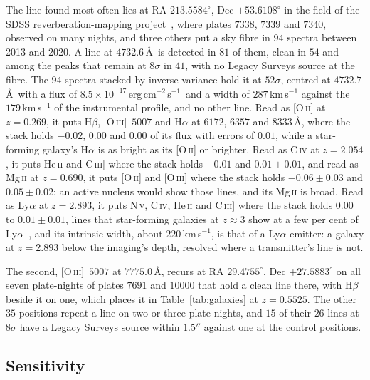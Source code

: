 \documentclass[3p,11pt]{elsarticle}
\newcommand{\flux}{erg\,cm$^{-2}$\,s$^{-1}$}
\begin{document}
The line found most often lies at RA $213.5584^\circ$, Dec $+53.6108^\circ$ in the field
of the SDSS reverberation-mapping project~\cite{Shen2015}, where plates $7338$, $7339$ and
$7340$, observed on many nights, and three others put a sky fibre in $94$ spectra between
2013 and 2020. A line at $4732.6$\,\AA\ is detected in $81$ of them, clean in $54$ and
among the peaks that remain at $8\sigma$ in $41$, with no Legacy Surveys source at the
fibre. The $94$ spectra stacked by inverse variance hold it at
$52\sigma$, centred at $4732.7$\,\AA\ with a flux of $8.5\times10^{-17}$\,\flux\ and a
width of $287$\,km\,s$^{-1}$ against the $179$\,km\,s$^{-1}$ of the instrumental profile,
and no other line. Read as [O\,\textsc{ii}] at $z=0.269$, it puts H$\beta$,
[O\,\textsc{iii}]~$5007$ and H$\alpha$ at $6172$, $6357$ and $8333$\,\AA, where the stack
holds $-0.02$, $0.00$ and $0.00$ of its flux with errors of $0.01$, while a star-forming
galaxy's H$\alpha$ is as bright as its [O\,\textsc{ii}] or brighter. Read as
C\,\textsc{iv} at $z=2.054$, it puts He\,\textsc{ii} and C\,\textsc{iii}] where the stack
holds $-0.01$ and $0.01\pm0.01$, and read as Mg\,\textsc{ii} at $z=0.690$, it puts
[O\,\textsc{ii}] and [O\,\textsc{iii}] where the stack holds $-0.06\pm0.03$ and
$0.05\pm0.02$; an active nucleus would show those lines, and its Mg\,\textsc{ii} is
broad. Read as Ly$\alpha$ at $z=2.893$, it puts N\,\textsc{v}, C\,\textsc{iv},
He\,\textsc{ii} and C\,\textsc{iii}] where the stack holds $0.00$ to $0.01\pm0.01$, lines
that star-forming galaxies at $z\approx3$ show at a few per cent of
Ly$\alpha$~\cite{Shapley2003}, and its intrinsic width, about $220$\,km\,s$^{-1}$, is that
of a Ly$\alpha$ emitter: a galaxy at $z=2.893$ below the imaging's depth, resolved where a
transmitter's line is not.

The second, [O\,\textsc{iii}]~$5007$ at $7775.0$\,\AA, recurs at RA $29.4755^\circ$, Dec
$+27.5883^\circ$ on all seven plate-nights of plates $7691$ and $10000$ that hold a clean
line there, with H$\beta$ beside it on one, which places it in
Table~\ref{tab:galaxies} at $z=0.5525$. The other $35$ positions repeat a line on two or
three plate-nights, and $15$ of their $26$ lines at $8\sigma$ have a Legacy Surveys source
within $1.5''$ against one at the control positions.

\subsection{Sensitivity}
\end{document}
